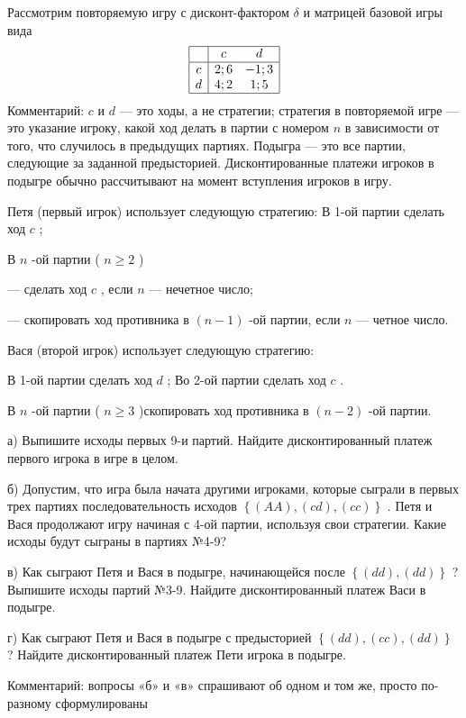 \begin{problem}

Рассмотрим повторяемую игру с дисконт-фактором  $\delta $  и матрицей базовой игры вида
\[\begin{array}{|c|cc|}  \hline {} & {c} & {d} \\  \hline {c} & {2;6} & {-1;3} \\ {d} & {4;2} & {1;5} \\  \hline  \end{array}\]
Комментарий:  $c$  и  $d$  — это ходы, а не стратегии; стратегия в повторяемой игре — это указание игроку, какой ход делать в партии с номером  $n$  в зависимости от того, что случилось в предыдущих партиях.
Подыгра — это все партии, следующие за заданной предысторией. Дисконтированные платежи игроков в подыгре обычно рассчитывают на момент вступления игроков в игру.\par
Петя (первый игрок) использует следующую стратегию:
В 1-ой партии сделать ход  $c$ ;\par
В  $n$ -ой партии ( $n\ge 2$ )\par
       — сделать ход  $c$ , если  $n$  — нечетное число;\par
       — скопировать ход противника в  $\left(n-1\right)$ -ой партии, если  $n$  — четное число.\par
Вася (второй игрок) использует следующую стратегию:\par
В 1-ой партии сделать ход  $d$ ; Во 2-ой партии сделать ход  $c$ .\par
В  $n$ -ой партии ( $n\ge 3$ )скопировать ход противника в  $\left(n-2\right)$ -ой партии.\par
а)      Выпишите исходы первых 9-и партий. Найдите дисконтированный платеж первого игрока в игре в целом.\par
б)      Допустим, что игра была начата другими игроками, которые сыграли в первых трех партиях последовательность исходов  $\left\{\left(AA\right),\left(cd\right),\left(cc\right)\right\}$ . Петя и Вася продолжают игру начиная с 4-ой партии, используя свои стратегии. Какие исходы будут сыграны в партиях №4-9?\par
в)      Как сыграют Петя и Вася в подыгре, начинающейся после  $\left\{\left(dd\right),\left(dd\right)\right\}$ ? Выпишите исходы партий №3-9. Найдите дисконтированный платеж Васи в подыгре.\par
г)      Как сыграют Петя и Вася в подыгре с предысторией  $\left\{\left(dd\right),\left(cc\right),\left(dd\right)\right\}$ ? Найдите дисконтированный платеж Пети игрока в подыгре.\par
Комментарий: вопросы «б» и «в» спрашивают об одном и том же, просто по-разному сформулированы



\begin{sol}

\end{sol}
\end{problem}



